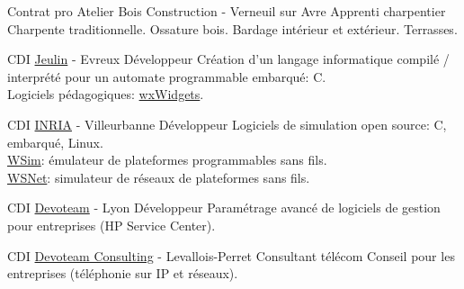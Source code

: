 \documentclass[10pt]{article} %
\begin{document}
\begin{paracol}{2}

  {Contrat pro} %
  {Atelier Bois Construction {\small- Verneuil sur Avre}} %
  {Apprenti charpentier} %
  {Charpente traditionnelle. Ossature bois. Bardage intérieur et extérieur. Terrasses.}  %


  {CDI} %
  {\href{https://www.jeulin.fr/}{Jeulin} {\small- Evreux}} %
  {Développeur} %
  {Création d'un langage informatique compilé / interprété pour un automate programmable embarqué: C. \\
    Logiciels pédagogiques: \href{https://www.wxwidgets.org/}{wxWidgets}.} %

  {CDI} %
  {\href{https://www.inria.fr/}{INRIA} {\small- Villeurbanne}} %
  {Développeur} %
  {Logiciels de simulation open source: C, embarqué, Linux. \\
    \href{http://wsim.gforge.inria.fr}{WSim}: émulateur de plateformes programmables sans fils. \\
    \href{http://wsnet.gforge.inria.fr}{WSNet}: simulateur de réseaux de plateformes sans fils.} %

  {CDI} %
  {\href{https://devoteam.com/}{Devoteam} {\small- Lyon}} %
  {Développeur} %
  {Paramétrage avancé de logiciels de gestion pour entreprises (HP Service Center).} %

  {CDI} %
  {\href{https://devoteam.com/}{Devoteam Consulting} {\small- Levallois-Perret}} %
  {Consultant télécom} %
  {Conseil pour les entreprises (téléphonie sur IP et réseaux).} %


  \vspace{-\baselineskip}\medskip %


\end{paracol}
\end{document}
